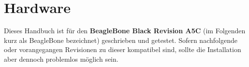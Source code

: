 \section{Hardware}
Dieses Handbuch ist für den \textbf{BeagleBone Black Revision A5C} (im Folgenden kurz als BeagleBone bezeichnet) geschrieben und getestet. Sofern nachfolgende oder vorangegangen Revisionen zu dieser kompatibel sind, sollte die Installation aber dennoch problemlos möglich sein.
